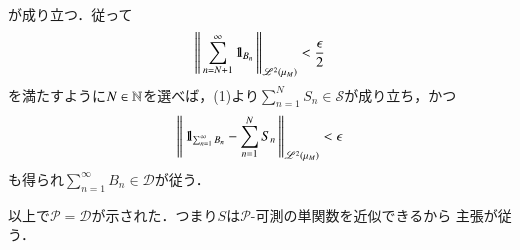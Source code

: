 \begin{prf}
\begin{description}
\begin{itemize}
\begin{align}
						\end{align}
						が成り立つ．従って
						\begin{align}
							\left\|\, \sum_{n=N+1}^{\infty}\mbox{1}\hspace{-0.25em}\mbox{l}_{B_n}\, \right\|_{\mathscr{L}^{2} \left(\mu_M\right)} < \frac{\epsilon}{2}
						\end{align}
						を満たすように$N \in \mathbb{N}$を選べば，(1)より$\sum_{n=1}^{N}S_n \in \mathcal{S}$が成り立ち，かつ
						\begin{align}
							\left\|\, \mbox{1}\hspace{-0.25em}\mbox{l}_{\sum_{n=1}^{\infty}B_n} - \sum_{n=1}^{N}S_n\, \right\|_{\mathscr{L}^{2} \left(\mu_M\right)} < \epsilon
						\end{align}
						も得られ$\sum_{n=1}^{\infty} B_n \in \mathcal{D}$が従う．
				\end{itemize}
				以上で$\mathcal{P} = \mathcal{D}$が示された．つまり$S$は$\mathcal{P}$-可測の単関数を近似できるから
				主張が従う．
				\QED
		\end{description}
	\end{prf}
